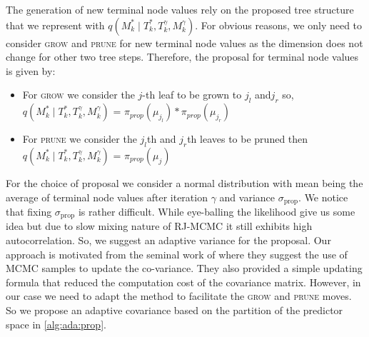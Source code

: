 \documentclass{amsart}
\begin{document}
The generation of new terminal node values rely on the proposed tree structure that we represent with $q\left(M_k^\ast\mid T_k^\ast, T_k^{\gamma}, M_k^{\gamma}\right)$. For obvious reasons, we only need to consider \textsc{grow} and \textsc{prune} for new terminal node values as the dimension does not change for other two tree steps. Therefore, the proposal for terminal node values is given by:
\begin{itemize}
	\item For \textsc{grow} we consider the $j$-th leaf to be grown to $j_l$ and$j_r$ so,
	$q\left(M_k^\ast\mid T_k^\ast, T_k^{\gamma}, M_k^{\gamma}\right)$ = $\pi_{prop}(\mu_{j_l})*\pi_{prop}(\mu_{j_r})$
	\item For \textsc{prune} we consider the $j_l$th and $j_r$th leaves to be pruned then $q\left(M_k^\ast\mid T_k^\ast, T_k^{\gamma}, M_k^{\gamma}\right)$ = $\pi_{prop}(\mu_j)$
\end{itemize}
For the choice of proposal we consider a normal distribution with mean being the average of terminal node values after iteration $\gamma$ and variance $\sigma_{\text{prop}}$. We notice that fixing $\sigma_{\text{prop}}$ is rather difficult. While eye-balling the likelihood give us some idea but due to slow mixing nature of RJ-MCMC it still exhibits high autocorrelation. So, we suggest an adaptive variance for the proposal. Our approach is motivated from the seminal work of \citet{haario_AMH} where they suggest the use of MCMC samples to update the co-variance. They also provided a simple updating formula that reduced the computation cost of the covariance matrix. However, in our case we need to adapt the method to facilitate the \textsc{grow} and \textsc{prune} moves. So we propose an adaptive covariance based on the partition of the predictor space in \cref{alg:ada:prop}.
\end{document}
